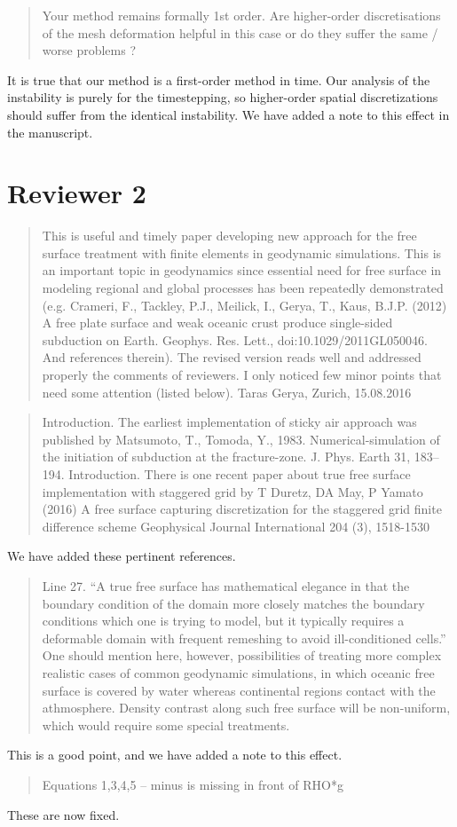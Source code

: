 \documentclass[a4paper,12pt]{article}
\begin{document}
\begin{quotation}
   Your method remains formally 1st order. Are higher-order discretisations of the mesh deformation helpful in this case or do they suffer the same / worse problems ?
\end{quotation}

It is true that our method is a first-order method in time.
Our analysis of the instability is purely for the timestepping,
so higher-order spatial discretizations should suffer from the identical instability.
We have added a note to this effect in the manuscript.

\section*{Reviewer 2}
\begin{quotation}
This is useful and timely paper developing new approach for the free surface treatment with finite elements in geodynamic simulations. This is an important topic in geodynamics since essential need for free surface in modeling regional and global processes has been repeatedly demonstrated (e.g. Crameri, F., Tackley, P.J., Meilick, I., Gerya, T., Kaus, B.J.P. (2012) A free plate surface and weak oceanic crust produce single-sided subduction on Earth. Geophys. Res. Lett., doi:10.1029/2011GL050046. And references therein). The revised version reads well and addressed properly the comments of reviewers. I only noticed few minor points that need some attention (listed below).
Taras Gerya, Zurich, 15.08.2016
\end{quotation}

\begin{quotation}
Introduction. The earliest implementation of sticky air approach was published by Matsumoto, T., Tomoda, Y., 1983. Numerical-simulation of the initiation of subduction at the fracture-zone. J. Phys. Earth 31, 183–194.
Introduction. There is one recent paper about true free surface implementation with staggered grid by T Duretz, DA May, P Yamato  (2016) A free surface capturing discretization for the staggered grid finite difference scheme Geophysical Journal International 204 (3), 1518-1530 
\end{quotation}
We have added these pertinent references.

\begin{quotation}
Line 27. “A true free surface has mathematical elegance in that the boundary condition of the domain more closely matches the boundary conditions which one is trying to model, but it typically requires a deformable domain with frequent remeshing to avoid ill-conditioned cells.” One should mention here, however, possibilities of treating more complex realistic cases of common geodynamic simulations, in which oceanic free surface is covered by water whereas continental regions contact with the athmosphere. Density contrast along such free surface will be non-uniform, which would require some special treatments.
\end{quotation}
This is a good point, and we have added a note to this effect.
\begin{quotation}
Equations 1,3,4,5 – minus is missing in front of RHO*g
\end{quotation}
These are now fixed.
\end{document}
